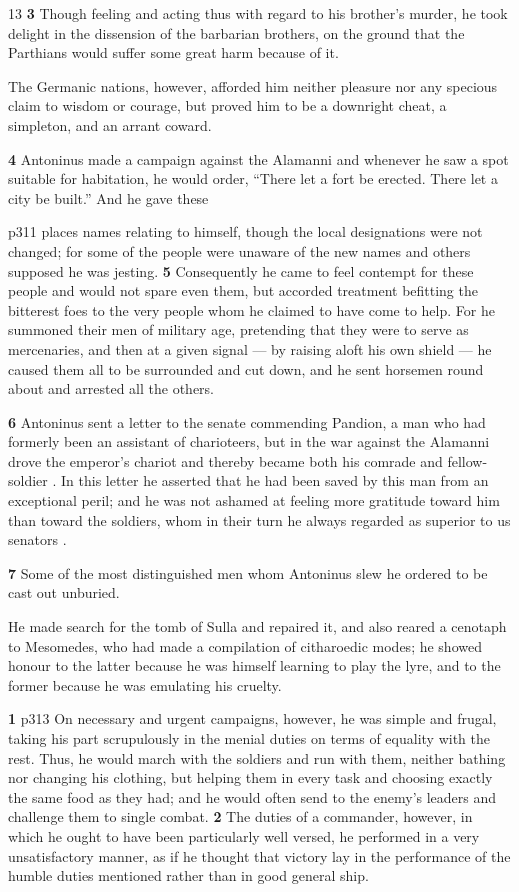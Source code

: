 13
\textbf{3} Though feeling and acting thus with regard to his brother's murder, he took delight in the dissension of the barbarian brothers, on the ground that the Parthians would suffer some great harm because of it.

The Germanic nations, however, afforded him neither pleasure nor any specious claim to wisdom or courage, but proved him to be a downright cheat, a simpleton, and an arrant coward.

\textbf{4} Antoninus made a campaign against the Alamanni and whenever he saw a spot suitable for habitation, he would order, ``There let a fort be erected. There let a city be built.'' And he gave these

p311 places names relating to himself, though the local designations were not changed; for some of the people were unaware of the new names and others supposed he was jesting. \textbf{5} Consequently he came to feel contempt for these people and would not spare even them, but accorded treatment befitting the bitterest foes to the very people whom he claimed to have come to help. For he summoned their men of military age, pretending that they were to serve as mercenaries, and then at a given signal \texthebrew{—} by raising aloft his own shield \texthebrew{—} he caused them all to be surrounded and cut down, and he sent horsemen round about and arrested all the others.

\textbf{6} Antoninus sent a letter to the senate commending Pandion, a man who had formerly been an assistant of charioteers, but in the war against the Alamanni drove the emperor's chariot and thereby became both his comrade and fellow-soldier . In this letter he asserted that he had been saved by this man from an exceptional peril; and he was not ashamed at feeling more gratitude toward him than toward the soldiers, whom in their turn he always regarded as superior to us senators .

\textbf{7} Some of the most distinguished men whom Antoninus slew he ordered to be cast out unburied.

He made search for the tomb of Sulla and repaired it, and also reared a cenotaph to Mesomedes, who had made a compilation of citharoedic modes; he showed honour to the latter because he was himself learning to play the lyre, and to the former because he was emulating his cruelty.

\textbf{1} p313
On necessary and urgent campaigns, however, he was simple and frugal, taking his part scrupulously in the menial duties on terms of equality with the rest. Thus, he would march with the soldiers and run with them, neither bathing nor changing his clothing, but helping them in every task and choosing exactly the same food as they had; and he would often send to the enemy's leaders and challenge them to single combat. \textbf{2} The duties of a commander, however, in which he ought to have been particularly well versed, he performed in a very unsatisfactory manner, as if he thought that victory lay in the performance of the humble duties mentioned rather than in good general ­ship.

